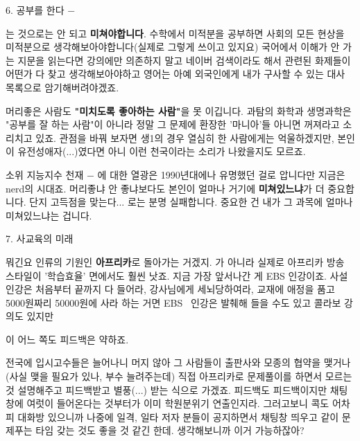 \item 6. 공부를 한다 $-$
\vspace{5mm}

는 것으로는 안 되고 \textbf{미쳐야합니다}.
수학에서 미적분을 공부하면 사회의 모든 현상을 미적분으로 생각해보아야합니다(실제로 그렇게 쓰이고 있지요)
국어에서 이해가 안 가는 지문을 읽는다면 강의에만 의존하지 말고 네이버 검색이라도 해서 관련된 화제들이 어떤가 다 찾고 생각해보아야하고
영어는 아예 외국인에게 내가 구사할 수 있는 대사 목록으로 암기해버려야겠죠.
\vspace{5mm}

머리좋은 사람도 \textbf{"미치도록 좋아하는 사람"}을 못 이깁니다.
과탐의 화학과 생명과학은 "공부를 잘 하는 사람"이 아니라 정말 그 문제에 환장한 '마니아'들 아니면 꺼져라고 소리치고 있죠.
관점을 바꿔 보자면 생1의 경우 열심히 한 사람에게는 억울하겠지만, 본인이 유전성애자(...)였다면 아니 이런 천국이라는 소리가 나왔을지도 모르죠.
\vspace{5mm}

소위 지능지수 천재 $-$ 에 대한 열광은 1990년대에나 유명했던 걸로 압니다만
지금은 nerd의 시대죠.
머리좋냐 안 좋냐보다도 본인이 얼마나 거기에 \textbf{미쳐있느냐}가 더 중요합니다.
단지 고득점을 맞는다... 로는 분명 실패합니다. 중요한 건 내가 그 과목에 얼마나 미쳐있느냐는 겁니다.
\vspace{5mm}

7. 사교육의 미래
\vspace{5mm}

뭐긴요 인류의 기원인 \textbf{아프리카}로 돌아가는 거겠지.
가 아니라 실제로 아프리카 방송 스타일이 '학습효율' 면에서도 훨씬 낫죠.
지금 가장 앞서나간 게 EBS 인강이죠.
사설 인강은 처음부터 끝까지 다 들어라, 강사님에게 세뇌당하여라, 교재에 애정을 품고 5000원짜리 50000원에 사라 하는 거면
EBS  인강은 발췌해 들을 수도 있고 콜라보 강의도 있지만
\vspace{5mm}

이 어느 쪽도 피드백은 약하죠.
\vspace{5mm}

전국에 입시고수들은 늘어나니 머지 않아 그 사람들이 출판사와 모종의 협약을 맺거나(사실 맺을 필요가 있나, 부수 늘려주는데)
직접 아프리카로 문제풀이를 하면서 모르는 것 설명해주고 피드백받고 별풍(...) 받는 식으로 가겠죠.
피드백도 피드백이지만 채팅창에 여럿이 들어온다는 것부터가 이미 학원분위기 연출인지라.
그러고보니 콕도 어차피 대화방 있으니까 나중에 일격, 일타 저자 분들이 공지하면서
채팅창 띄우고 같이 문제푸는 타임 갖는 것도 좋을 것 같긴 한데. 생각해보니까 이거 가능하잖아?
\vspace{5mm}





